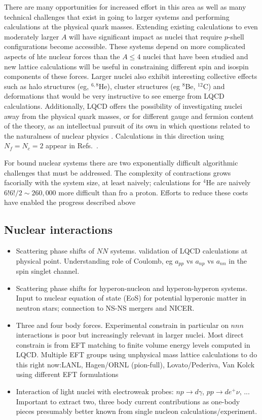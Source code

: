 There are many opportunities for increased effort in this area as well as many technical challenges that exist in going to larger systems and performing calculations at the physical quark masses. 
Extending existing calculations to even moderately larger $A$ will have significant impact as nuclei that require $p$-shell configurations become accessible. These systems depend on more complicated aspects of hte nuclear forces than the $A\le4$ nuclei that have been studied and new lattice calculations will be useful in constraining different spin and isospin components of these forces. Larger nuclei also exhibit interesting collective effects such as halo structures (eg,  ${}^{6,8}$He), cluster structures (eg ${}^{8}$Be, ${}^{12}$C) and deformations that would be very instructive to see emerge from LQCD calculations. Additionally, LQCD offers the possibility of investigating nuclei away from the physical quark masses, or for different gauge and fermion content of the theory, as an intellectual pursuit of its own in which questions related to the naturalness of nuclear physics \cite{Orginos:2015aya}. Calculations in this direction using $N_f=N_c=2$ appear in Refs.~\cite{Detmold:2014qqa,Detmold:2014kba}.

For bound nuclear systems there are two exponentially difficult algorithmic challenges that must be addressed. The complexity of contractions grows 
facorially with the system size, at least naively; calculations for $^4$He are naively $6!6!/2\sim 260,000$ more difficult than fro a proton. Efforts to reduce these costs have enabled the progress described above


\subsection{Nuclear interactions}

\begin{itemize}
	\item Scattering  phase shifts of $NN$ systems. validation of LQCD calculations at physical point. Understanding role of Coulomb, eg $a_{pp}$ vs $a_{np}$ vs $a_{nn}$ in the spin singlet channel.
	\item Scattering phase shifts for  hyperon-nucleon and hyperon-hyperon systems. Input to nuclear equation of state (EoS) for potential hyperonic matter in neutron stars; connection to NS-NS mergers and NICER.
	\item Three and four body forces. Experimental constrain in particular on $nnn$ interactions is poor but increasingly relevant in larger nuclei. Most direct constrain is from EFT matching to finite volume energy levels computed in LQCD. Multiple EFT groups using unphysical mass lattice calculations to do this right now:LANL, Hagen/ORNL (pion-full), Lovato/Pederiva, Van Kolck using different EFT formulations
	\item Interaction of light nuclei with electroweak probes: $np\to d\gamma$, $pp\to de^+\nu$, ... 
	Important to extract two, three body current contributions as one-body pieces presumably better known from single nucleon calculations/experiment.
\end{itemize}


